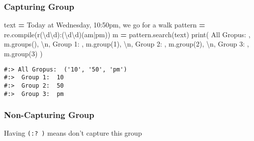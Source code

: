 \documentclass[
]{book}
\newenvironment{Shaded}{\begin{snugshade}}{\end{snugshade}}
\newcommand{\BuiltInTok}[1]{#1}
\newcommand{\CharTok}[1]{\textcolor[rgb]{0.5,0.5,0.5}{#1}}
\newcommand{\DecValTok}[1]{\textcolor[rgb]{0.06,0.06,0.06}{#1}}
\newcommand{\NormalTok}[1]{#1}
\newcommand{\OperatorTok}[1]{\textcolor[rgb]{0.43,0.43,0.43}{\textbf{#1}}}
\newcommand{\StringTok}[1]{\textcolor[rgb]{0.5,0.5,0.5}{#1}}
\newcommand{\VerbatimStringTok}[1]{\textcolor[rgb]{0.5,0.5,0.5}{#1}}
\begin{document}
\hypertarget{capturing-group}{%
\subsubsection{Capturing Group}\label{capturing-group}}

\begin{Shaded}
\begin{Highlighting}[]
\NormalTok{text }\OperatorTok{=} \StringTok{\textquotesingle{}Today at Wednesday, 10:50pm, we go for a walk\textquotesingle{}}
\NormalTok{pattern }\OperatorTok{=}\NormalTok{ re.}\BuiltInTok{compile}\NormalTok{(}\VerbatimStringTok{r\textquotesingle{}(\textbackslash{}d\textbackslash{}d):(\textbackslash{}d\textbackslash{}d)(am|pm)\textquotesingle{}}\NormalTok{)}
\NormalTok{m }\OperatorTok{=}\NormalTok{ pattern.search(text)}
\BuiltInTok{print}\NormalTok{(}
  \StringTok{\textquotesingle{}All Gropus: \textquotesingle{}}\NormalTok{, m.groups(), }\StringTok{\textquotesingle{}}\CharTok{\textbackslash{}n}\StringTok{\textquotesingle{}}\NormalTok{,}
  \StringTok{\textquotesingle{}Group 1: \textquotesingle{}}\NormalTok{, m.group(}\DecValTok{1}\NormalTok{), }\StringTok{\textquotesingle{}}\CharTok{\textbackslash{}n}\StringTok{\textquotesingle{}}\NormalTok{,}
  \StringTok{\textquotesingle{}Group 2: \textquotesingle{}}\NormalTok{, m.group(}\DecValTok{2}\NormalTok{), }\StringTok{\textquotesingle{}}\CharTok{\textbackslash{}n}\StringTok{\textquotesingle{}}\NormalTok{,}
  \StringTok{\textquotesingle{}Group 3: \textquotesingle{}}\NormalTok{, m.group(}\DecValTok{3}\NormalTok{) )}
\end{Highlighting}
\end{Shaded}

\begin{verbatim}
#:> All Gropus:  ('10', '50', 'pm') 
#:>  Group 1:  10 
#:>  Group 2:  50 
#:>  Group 3:  pm
\end{verbatim}

\hypertarget{non-capturing-group}{%
\subsubsection{Non-Capturing Group}\label{non-capturing-group}}

Having \texttt{(:?\ )} means don't capture this group
\end{document}
